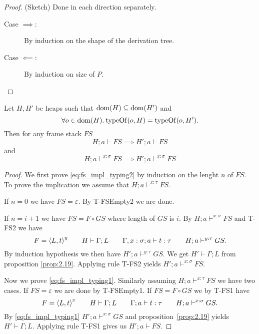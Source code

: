 \begin{proof} (Sketch) Done in each direction separately.
  \begin{description}
    \item[Case $\implies$:] By induction on the shape of the derivation tree.
    \item[Case $\impliedby$:] By induction on size of $P$.
  \end{description}
\end{proof}

\begin{proposition} \label{prop:2.14}
  Let $H, H'$ be heaps such that $\mbox{$\mathrm{dom}$}{(H)} \subseteq \mbox{$\mathrm{dom}$}{(H')}$ and 
  \begin{equation*}
    \forall o \in \mbox{$\mathrm{dom}$}{(H)}. \: \mbox{$\mathrm{typeOf}$}{(o, H)} = \mbox{$\mathrm{typeOf}$}{(o, H')}.
  \end{equation*}
  Then for any frame stack $FS$
  \begin{equation}\label{eq:fs_impl_typing1}
    H; a \vdash FS \implies H'; a \vdash FS
  \end{equation}
  and
  \begin{equation} \label{eq:fs_impl_typing2}
    H; a \vdash^{x :\sigma} FS \implies H'; a \vdash^{x: \sigma} FS 
  \end{equation}
\end{proposition}

\begin{proof}
  We first prove \eqref{eq:fs_impl_typing2} by induction on the lenght $n$ of
  $FS$. To prove the implication we assume that $H; a \vdash^{x: \tau} FS$.
  
  If $n = 0$ we have $FS = \varepsilon$. By {\sc T-FSEmpty2} we are done.
  
  If $n = i + 1$ we have $FS = F \circ GS$ where length of $GS$ is $i$. By  
  $H; a \vdash^{x: \sigma} FS$ and {\sc T-FS2} we have 
  \begin{equation*}
    F = \mbox{$\langle L, t \rangle$}^{y} \quad\quad H \vdash \Gamma; L \quad\quad \mbox{$\Gamma, x:
    \sigma;a\vdash t:\tau$} \quad\quad H; a \vdash^{y: \tau} GS.
  \end{equation*}
  By induction hypothesis we then have $H'; a \vdash^{y: \tau} GS$. We get $H'
  \vdash \Gamma; L$ from proposition \ref{prop:2.19}. Applying rule {\sc T-FS2}
  yields $H'; a \vdash^{x: \sigma} FS$.

  Now we prove \eqref{eq:fs_impl_typing1}. Similarly assuming $H; a \vdash^{x:
  \tau} FS$ we have two cases. If $FS = \varepsilon$ we are done by {\sc
  T-FSEmpty1}. If $FS = F \circ GS$ we by {\sc T-FS1} have
  \begin{equation*}
    F = \mbox{$\langle L, t \rangle$}^{x} \quad\quad H \vdash \Gamma; L \quad\quad
    \mbox{$\Gamma;a\vdash t:\tau$} \quad\quad H; a \vdash^{x: \sigma} GS.
  \end{equation*}
  By \eqref{eq:fs_impl_typing1} $H'; a \vdash^{x: \sigma} GS$ and
  proposition~\ref{prop:2.19} yields $H' \vdash \Gamma; L$. Applying rule {\sc
  T-FS1} gives us $H'; a \vdash FS$.
\end{proof}

